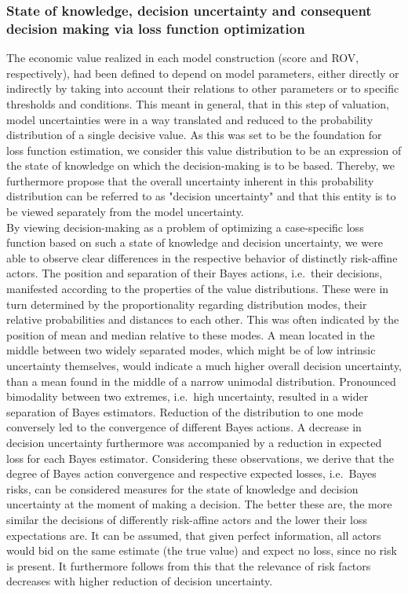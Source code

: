 	\subsubsection{State of knowledge, decision uncertainty and consequent decision making via loss function optimization}
	The economic value realized in each model construction (score and ROV, respectively), had been defined to depend on model parameters, either directly or indirectly by taking into account their relations to other parameters or to specific thresholds and conditions. This meant in general, that in this step of valuation, model uncertainties were in a way translated and reduced to the probability distribution of a single decisive value. As this was set to be the foundation for loss function estimation, we consider this value distribution to be an expression of the state of knowledge on which the decision-making is to be based. Thereby, we furthermore propose that the overall uncertainty inherent in this probability distribution can be referred to as "decision uncertainty" and that this entity is to be viewed separately from the model uncertainty.\\	
	By viewing decision-making as a problem of optimizing a case-specific loss function based on such a state of knowledge and decision uncertainty, we were able to observe clear differences in the respective behavior of distinctly risk-affine actors.
	The position and separation of their Bayes actions, i.e.\ their decisions, manifested according to the properties of the value distributions. These were in turn determined by the proportionality regarding distribution modes, their relative probabilities and distances to each other. This was often indicated by the position of mean and median relative to these modes. A mean located in the middle between two widely separated modes, which might be of low intrinsic uncertainty themselves, would indicate a much higher overall decision uncertainty, than a mean found in the middle of a narrow unimodal distribution. Pronounced bimodality between two extremes, i.e.\ high uncertainty, resulted in a wider separation of Bayes estimators. Reduction of the distribution to one mode conversely led to the convergence of different Bayes actions. A decrease in decision uncertainty furthermore was accompanied by a reduction in expected loss for each Bayes estimator. 
	Considering these observations, we derive that the degree of Bayes action convergence and respective expected losses, i.e.\ Bayes risks, can be considered measures for the state of knowledge and decision uncertainty at the moment of making a decision. The better these are, the more similar the decisions of differently risk-affine actors and the lower their loss expectations are. It can be assumed, that given perfect information, all actors would bid on the same estimate (the true value) and expect no loss, since no risk is present. It furthermore follows from this that the relevance of risk factors decreases with higher reduction of decision uncertainty.
